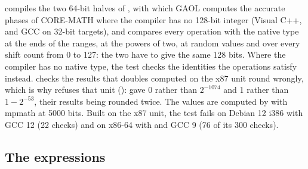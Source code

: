 \documentclass[12pt,a4paper,twoside,openright]{book}
\begin{document}
\medskip
{} compiles the two 64-bit halves of ,
with which GAOL computes the accurate phases of CORE-MATH where the compiler
has no 128-bit integer (Visual C++, and GCC on 32-bit targets), and compares
every operation with the native type at the ends of the ranges, at the
powers of two, at random values and over every shift count from 0 to 127:
the two have to give the same 128 bits. Where the compiler has no native
type, the test checks the identities the operations satisfy instead.
 checks the results that doubles computed on the
x87 unit round wrongly, which is why  refuses
that unit ():  gave 0
rather than $2^{-1074}$ and  1 rather
than $1-2^{-53}$, their results being rounded twice. The values are computed
by  with mpmath at 5000 bits. Built on
the x87 unit, the test fails on Debian 12 i386 with GCC 12 (22 checks) and
on x86-64 with  and GCC 9 (76 of its 300 checks).

\subsection{The expressions}
\end{document}
